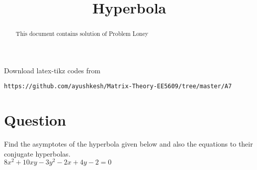 \documentclass[journal,12pt,twocolumn]{IEEEtran}
\begin{document}
\makeatletter
{}
\makeatother
\let\StandardTheFigure\thefigure
\let\vec\mathbf
\renewcommand{\thefigure}{\theproblem}
\def\putbox#1#2#3{\makebox[0in][l]{\makebox[#1][l]{}\raisebox{\baselineskip}[0in][0in]{\raisebox{#2}[0in][0in]{#3}}}}
     \def\rightbox#1{\makebox[0in][r]{#1}}
     \def\centbox#1{\makebox[0in]{#1}}
     \def\topbox#1{\raisebox{-\baselineskip}[0in][0in]{#1}}
\vspace{3cm}
\title{Hyperbola}
\maketitle
\newpage
\bigskip
\renewcommand{\thefigure}{\theenumi}
\renewcommand{\thetable}{\theenumi}
\begin{abstract}
This document contains solution of Problem Loney
\end{abstract}
Download latex-tikz codes from 
%
\begin{lstlisting}
https://github.com/ayushkesh/Matrix-Theory-EE5609/tree/master/A7
\end{lstlisting}
\section{\textbf{Question}}
Find the asymptotes of the hyperbola given below and also the equations to their conjugate hyperbolas.\\
$8x^2+10xy-3y^2-2x+4y-2=0$
\end{document}
